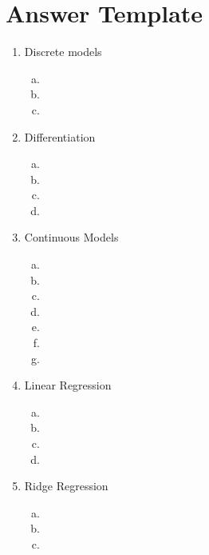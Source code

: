 \documentclass[12pt,twoside]{article}
\begin{document}
\section{Answer Template}
\begin{enumerate}[1)]
\item Discrete models

\begin{enumerate}[a)]
\addtocounter{enumii}{2} %
\item 
\item
\item 
\end{enumerate}


\item Differentiation

\begin{enumerate}[a)]
\item 
\item
\addtocounter{enumii}{1} 
\item 
\item
\end{enumerate}


\item Continuous Models

\begin{enumerate}[a)]
\item 
\item
\item 
\item 
\item
\item 
\item 
\end{enumerate}

\item Linear Regression


\begin{enumerate}[a)]
\item 
\item
\item 
\item 
\end{enumerate}

\item Ridge Regression


\begin{enumerate}[a)]
\item 
\item
\item 


\end{enumerate}
\end{enumerate}
\end{document}
